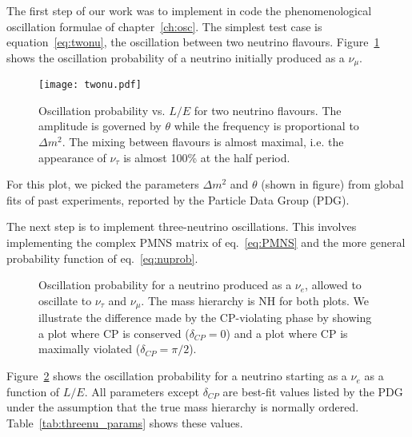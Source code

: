 The first step of our work was to implement in code the phenomenological
oscillation formulae of chapter~\ref{ch:osc}. The simplest test case
is equation~\ref{eq:twonu}, the oscillation between two neutrino flavours.
Figure~\ref{fig:twonu_plots} shows the oscillation
probability of a neutrino initially produced as a $\nu_\mu$. 
\begin{figure}
	\centering
	\texttt{[image: twonu.pdf]}
	\captionsetup{width=0.9\textwidth}
	\caption{Oscillation probability vs. $L/E$ for two neutrino flavours. The
	amplitude is governed by $\theta$ while the frequency is proportional to
	$\Delta m^2$. The mixing between flavours is almost maximal, i.e. the
	appearance of $\nu_\tau$ is almost 100\% at the half period.}
	\label{fig:twonu_plots}
\end{figure}
For this plot, we picked the parameters $\Delta m^2$ and $\theta$ (shown in
figure) from global fits of past experiments, reported by the Particle Data
Group (PDG)\cite{pdg}.

The next step is to implement three-neutrino oscillations. This involves
implementing the complex PMNS matrix of eq.~\ref{eq:PMNS} and the more general
probability function of eq.~\ref{eq:nuprob}. 
\begin{figure}
	\centering
\caption{Oscillation probability for a neutrino produced as a $\nu_e$, allowed to
	oscillate to $\nu_\tau$ and $\nu_\mu$. The mass hierarchy is NH for both
	plots. We illustrate the difference made by
	the CP-violating phase by showing a plot where CP is conserved
	($\delta_{CP}=0$) and a plot where CP is maximally violated ($\delta_{CP} =
	\pi/2$).}
\label{fig:threenu_plots}
\end{figure}
Figure~\ref{fig:threenu_plots} shows the oscillation probability for a neutrino
starting as a $\nu_e$ as a function of $L/E$. All parameters except
$\delta_{CP}$ are best-fit values listed by the PDG\cite{pdg} under the
assumption that the true mass hierarchy is normally ordered.
Table~\ref{tab:threenu_params} shows these values.


